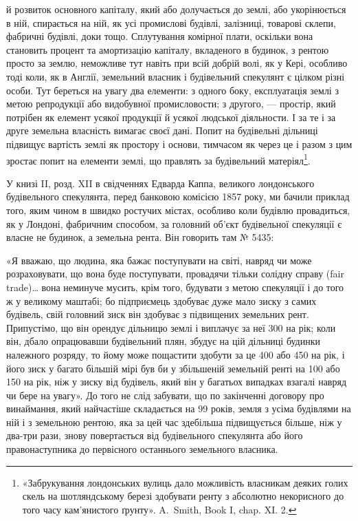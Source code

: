 \parcont{}  %
й розвиток основного капіталу, який або долучається до землі, або укорінюється
в ній, спирається на ній, як усі промислові будівлі, залізниці, товарові склепи,
фабричні будівлі, доки тощо. Сплутування комірної плати, оскільки вона становить
процент та амортизацію капіталу, вкладеного в будинок, з рентою просто за
землю, неможливе тут навіть при всій добрій волі, як у Кері, особливо тоді
коли, як в Англії, земельний власник і будівельний спекулянт є цілком різні
особи. Тут береться на увагу два елементи: з одного боку, експлуатація землі
з метою репродукції або видобувної промисловости; з другого, — простір, який
потрібен як елемент усякої продукції й усякої людської діяльности. І за те і за
друге земельна власність вимагає своєї дані. Попит на будівельні дільниці підвищує
вартість землі як простору і основи, тимчасом як через це і разом
з цим зростає попит на елементи землі, що правлять за будівельний матеріял\footnote{
«Забрукування лондонських вулиць дало можливість власникам деяких голих скель на шотляндському
березі здобувати ренту з абсолютно некорисного до того часу кам’янистого ґрунту». A.~Smith, Book I,
chap. XI. 2.
}.

У книзі II, розд. XII в свідченнях Едварда Каппа, великого лондонського
будівельного спекулянта, перед банковою комісією 1857 року, ми бачили приклад
того, яким чином в швидко ростучих містах, особливо коли будівлю провадиться,
як у Лондоні, фабричним способом, за головний об’єкт будівельної
спекуляції є власне не будинок, а земельна рента. Він говорить там № 5435:

«Я вважаю, що людина, яка бажає поступувати на світі, навряд чи може
розраховувати, що вона буде поступувати, провадячи тільки солідну справу (fair
trade)\dots{} вона неминуче мусить, крім того, будувати з метою спекуляції і до
того ж у великому маштабі; бо підприємець здобуває дуже мало зиску з самих
будівель, свій головний зиск він здобуває з підвищених земельних рент. Припустімо,
що він орендує дільницю землі і виплачує за неї 300 на рік;
коли він, дбало опрацювавши будівельний плян, збудує на цій дільниці будинки
належного розряду, то йому може пощастити здобути за це 400 або 450
на рік, і його зиск у багато більшій мірі був би у збільшеній земельній ренті
на 100 або 150 на рік, ніж у зиску від будівель, який він у багатьох
випадках взагалі навряд чи бере на увагу». До того не слід забувати, що
по закінченні договору про винаймання, який найчастіше складається на 99 років,
земля з усіма будівлями на ній і з земельною рентою, яка за цей час
здебільша підвищується більше, ніж у два-три рази, знову повертається від
будівельного спекулянта або його правонаступника до первісного останнього
земельного власника.

